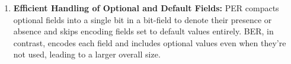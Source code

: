 \documentclass[a4paper,10pt]{article}
\begin{document}
\begin{enumerate}[label=\textbf{Question \arabic*.}]
\begin{enumerate}
        \item \textbf{Efficient Handling of Optional and Default Fields:} PER compacts optional fields into a single bit in a bit-field to denote their presence or absence and skips encoding fields set to default values entirely. BER, in contrast, encodes each field and includes optional values even when they’re not used, leading to a larger overall size.
    \end{enumerate}

        
\end{enumerate}


    
\end{document}
